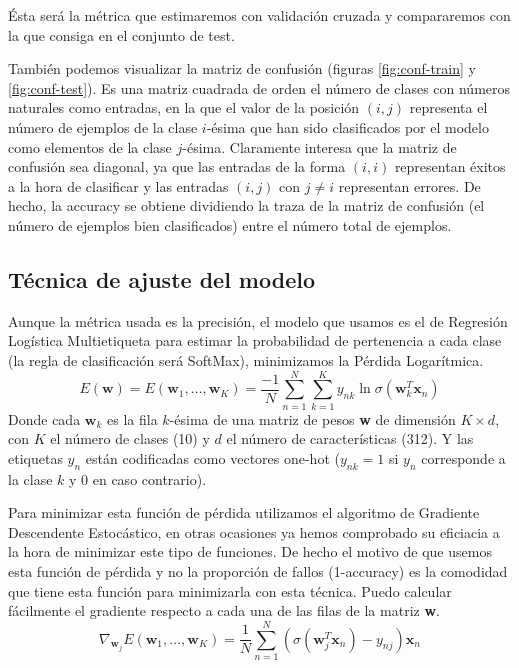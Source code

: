 \documentclass[a4]{article}
\begin{document}
Ésta será la métrica que estimaremos con validación cruzada y
compararemos con la que consiga en el conjunto de test.

También podemos visualizar la matriz de confusión (figuras
\ref{fig:conf-train} y \ref{fig:conf-test}). Es una matriz cuadrada de
orden el número de clases con números naturales como entradas, en la
que el valor de la posición $(i,j)$ representa el número de ejemplos
de la clase $i$-ésima que han sido clasificados por el modelo como
elementos de la clase $j$-ésima. Claramente interesa que la matriz de
confusión sea diagonal, ya que las entradas de la forma $(i,i)$
representan éxitos a la hora de clasificar y las entradas $(i,j)$ con
$j\neq i$ representan errores. De hecho, la accuracy se obtiene
dividiendo la traza de la matriz de confusión (el número de ejemplos
bien clasificados) entre el número total de ejemplos.

\subsection{Técnica de ajuste del modelo}

Aunque la métrica usada es la precisión, el modelo que usamos es el de
Regresión Logística Multietiqueta para estimar la probabilidad de
pertenencia a cada clase (la regla de clasificación será SoftMax),
minimizamos la Pérdida Logarítmica. \vspace{-2mm}
\[E(\textbf{w})=E(\textbf{w}_1,\ldots,\textbf{w}_K)=\frac{-1}{N}\sum_{n=1}^N\sum_{k=1}^{K}y_{nk}\ln\sigma(\textbf{w}_k^T \textbf{x}_n)\]
Donde cada $\textbf{w}_k$ es la fila $k$-ésima de una matriz de pesos
\textbf{w} de dimensión $K\times d$, con $K$ el número de clases (10)
y $d$ el número de características (312). Y las etiquetas $y_n$ están
codificadas como vectores one-hot ($y_{nk}=1$ si $y_n$ corresponde a
la clase $k$ y 0 en caso contrario).

Para minimizar esta función de pérdida utilizamos el algoritmo de
Gradiente Descendente Estocástico, en otras ocasiones ya hemos
comprobado su eficiacia a la hora de minimizar este tipo de funciones.
De hecho el motivo de que usemos esta función de pérdida y no la
proporción de fallos (1-accuracy) es la comodidad que tiene esta
función para minimizarla con esta técnica. Puedo calcular fácilmente
el gradiente respecto a cada una de las filas de la matriz \textbf{w}.\vspace{-2mm}
\[\nabla_{\textbf{w}_j}E(\textbf{w}_1,\ldots,\textbf{w}_K)=\frac{1}{N}\sum_{n=1}^N(\sigma(\textbf{w}_j^T \textbf{x}_n)-y_{nj})\textbf{x}_n\]\vspace{-4mm}
\end{document}
